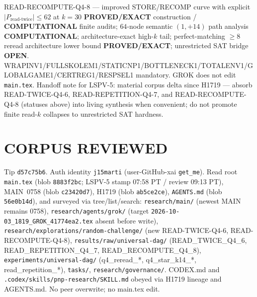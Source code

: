 \documentclass[11pt]{article}
\begin{document}
READ-RECOMPUTE-Q4-8 --- improved STORE/RECOMP curve with explicit
$|P_{\mathrm{read\textrm{-}twice}}|\le62$ at $k=30$ \textbf{PROVED/EXACT} construction /
\textbf{COMPUTATIONAL} finite audits; $64$-node semantic $(1,+14)$ path analysis
\textbf{COMPUTATIONAL}; architecture-exact high-$k$ tail; perfect-matching
$\ge8$ reread architecture lower bound \textbf{PROVED/EXACT}; unrestricted SAT bridge
\textbf{OPEN}.
WRAPINV1/FULLSKOLEM1/STATICNP1/BOTTLENECK1/TOTALENV1/GLOBALGAME1/CERTREG1/RESPSEL1 mandatory.
GROK does not edit \texttt{main.tex}.
Handoff note for LSPV-5: material corpus delta since H1719 --- absorb READ-TWICE-Q4-6,
READ-REPETITION-Q4-7, and READ-RECOMPUTE-Q4-8 (statuses above) into living synthesis when
convenient; do not promote finite read-$k$ collapses to unrestricted SAT hardness.

\section*{CORPUS REVIEWED}
Tip \texttt{d57c75b6}. Auth identity \texttt{j15marti}
(user-GitHub-xai \texttt{get\_me}).
Read root \texttt{main.tex} (blob \texttt{8883f2bc}; LSPV-5 stamp 07:58 PT / review 09:13 PT),
MAIN~0758 (blob \texttt{c23420d7}),
H1719 (blob \texttt{ab5ce2ce}),
\texttt{AGENTS.md} (blob \texttt{56e0b14d}),
and surveyed via tree/list/search:
\texttt{research/main/} (newest MAIN remains 0758),
\texttt{research/agents/grok/} (target \texttt{2026-10-03\_1819\_GROK\_41774ea2.tex} absent before write),
\texttt{research/explorations/random-challenge/} (new READ-TWICE-Q4-6, READ-RECOMPUTE-Q4-8),
\texttt{results/raw/universal-dag/} (READ\_TWICE\_Q4\_6, READ\_REPETITION\_Q4\_7, READ\_RECOMPUTE\_Q4\_8),
\texttt{experiments/universal-dag/} (q4\_reread\_*, q4\_star\_k14\_*, read\_repetition\_*),
\texttt{tasks/},
\texttt{research/governance/}.
CODEX.md and \texttt{.codex/skills/pnp-research/SKILL.md} obeyed via H1719 lineage and AGENTS.md.
No peer overwrite; no main.tex edit.
\end{document}
